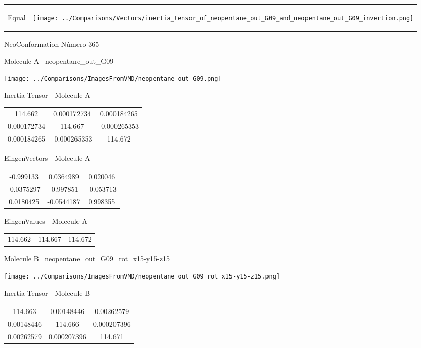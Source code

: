\vtab[-5mm]
\begin{tabular}{*{2}{m{}}}
\begin{center}
\textcolor{NavyBlue}{\Large Equal}
\end{center}
&
\begin{center}
\texttt{[image: ../Comparisons/Vectors/inertia\_tensor\_of\_neopentane\_out\_G09\_and\_neopentane\_out\_G09\_invertion.png]}
\end{center}
\end{tabular}

 \newpage

\vtab[-3cm]
\begin{center}
{\large NeoConformation \tab Número 365}
\end{center}
\begin{multicols}{2}
\begin{center}

Molecule A \
neopentane\_out\_G09

\texttt{[image: ../Comparisons/ImagesFromVMD/neopentane\_out\_G09.png]}

Inertia Tensor - Molecule A \\
\begin{tabular}{|c c c|}
114.662	 & 	0.000172734	 & 	0.000184265	 \\
0.000172734	 & 	114.667	 & 	-0.000265353	 \\
0.000184265	 & 	-0.000265353	 & 	114.672
\end{tabular}

\vtab
 EingenVectors - Molecule A     \\
\begin{tabular}{|c c c|}
-0.999133	 & 	0.0364989	 & 	0.020046	 \\
-0.0375297	 & 	-0.997851	 & 	-0.053713	 \\
0.0180425	 & 	-0.0544187	 & 	0.998355
\end{tabular}

\vtab
 EingenValues - Molecule A     \\
\begin{tabular}{|c c c|}
114.662	 & 	114.667	 & 	114.672	 \\
\end{tabular}
\columnbreak

Molecule B \
neopentane\_out\_G09\_rot\_x15-y15-z15

\texttt{[image: ../Comparisons/ImagesFromVMD/neopentane\_out\_G09\_rot\_x15-y15-z15.png]}

Inertia Tensor - Molecule B \\
\begin{tabular}{|c c c|}
114.663	 & 	0.00148446	 & 	0.00262579	 \\
0.00148446	 & 	114.666	 & 	0.000207396	 \\
0.00262579	 & 	0.000207396	 & 	114.671
\end{tabular}


\end{center}
\end{multicols}
